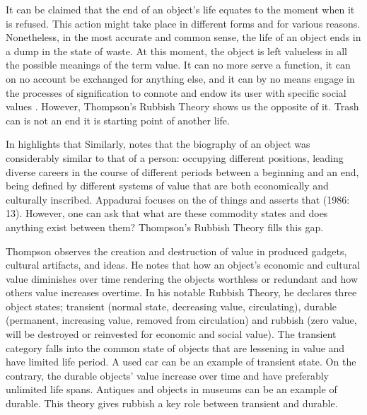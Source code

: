 It can be claimed that the end of an object’s life equates to the moment when it is refused. This action might take place in different forms and for various reasons. Nonetheless, in the most accurate and common sense, the life of an object ends in a dump in the state of waste. At this moment, the object is left valueless in all the possible meanings of the term value. It can no more serve a function, it can on no account be exchanged for anything else, and it can by no means engage in the processes of signification to connote and endow its user with specific social values \citep[63]{emgin2012trashion}. However, Thompson’s Rubbish Theory shows us the opposite of it. Trash can is not an end it is starting point of another life.

In  \citet[3]{appadurai1988social} highlights that  Similarly, \cite{kopytoff1986cultural} notes that the biography of an object was considerably similar to that of a person: occupying different positions, leading diverse careers in the course of different periods between a beginning and an end, being defined by different systems of value that are both economically and culturally inscribed. Appadurai focuses on the  of things and asserts that  (1986: 13). However, one can ask that what are these commodity states and does anything exist between them? Thompson’s Rubbish Theory fills this gap.

Thompson observes the creation and destruction of value in produced gadgets, cultural artifacts, and ideas. He notes that how an object’s economic and cultural value diminishes over time rendering the objects worthless or redundant and how others value increases overtime. In his notable Rubbish Theory, he declares three object states; transient (normal state, decreasing value, circulating), durable (permanent, increasing value, removed from circulation) and rubbish (zero value, will be destroyed or reinvested for economic and social value). The transient category falls into the common state of objects that are lessening in value and have limited life period. A used car can be an example of transient state. On the contrary, the durable objects’ value increase over time and have preferably unlimited life spans. Antiques and objects in museums can be an example of durable. This theory gives rubbish a key role between transient and durable.

